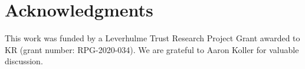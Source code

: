 \documentclass[doc,biblatex]{apa7}
\begin{document}

\section{Acknowledgments}

\noindent This work was funded by a Leverhulme Trust Research Project Grant awarded to KR (grant number: RPG-2020-034). We are grateful to Aaron Koller for valuable discussion.

\printbibliography
\end{document}
